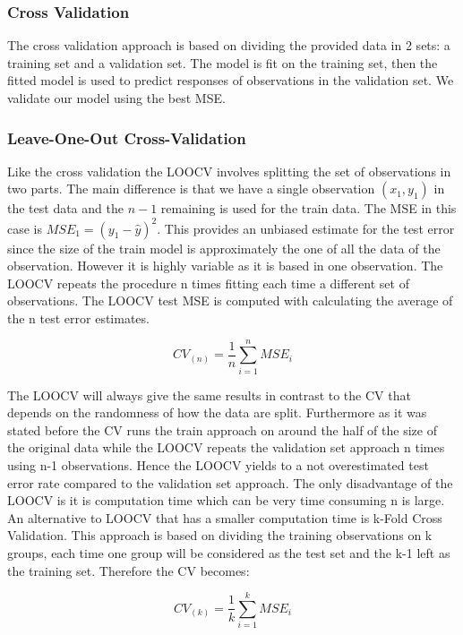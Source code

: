 \documentclass[]{report}
\begin{document}
\subsubsection{Cross Validation}
The cross validation approach is based on dividing the provided data in 2 sets: a training set and a validation set. The model is fit on the training set, then the fitted model is used to predict responses of observations in the validation set. We validate our model using the best MSE.

\subsubsection{Leave-One-Out Cross-Validation}
Like the cross validation the LOOCV involves splitting the set of observations in two parts. The main difference is that we have a single observation $(x_1, y_1)$ in the test data and the $n-1$ remaining is used for the train data. The MSE in this case is $MSE_1 =(y_1 - \hat{y})^{2}$. This provides an unbiased estimate for the test error since the size of the train model is approximately the one of all the data of the observation. However it is highly variable as it is based in one observation. The LOOCV repeats the procedure n times fitting each time a different set of observations. The LOOCV test MSE is computed with calculating the average of the n test error estimates.
  
\begin{center}
	$$CV_{(n)} = \frac{1}{n} \sum_{i=1}^{n} MSE_{i} $$
\end{center}

The LOOCV will always give the same results in contrast to the CV that depends on the randomness of how the data are split. Furthermore as it was stated before the CV runs the train approach on around the half of the size of the original data while the LOOCV repeats the validation set approach n times using n-1 observations. Hence the LOOCV yields to a not overestimated test error rate compared to the validation set approach. The only disadvantage of the LOOCV is it is computation time which can be very time consuming n is large.\\

An alternative to LOOCV that has a smaller computation time is k-Fold Cross Validation. This approach is based on dividing the training observations on k groups, each time one group will be considered as the test set and the k-1 left as the training set. Therefore the CV becomes:

\begin{center}
	$$CV_{(k)} = \frac{1}{k} \sum_{i=1}^{k} MSE_{i} $$
\end{center}
\end{document}
